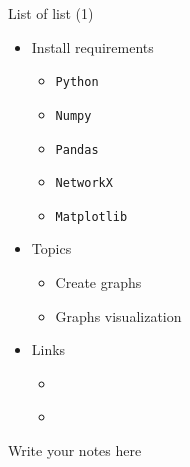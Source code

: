 \documentclass[aspectratio=169]{beamer}
\begin{document}
        \begin{frame}{List of list (1)}
            \begin{itemize}
                \item Install requirements
                    \begin{itemize}
                        \item \texttt{Python}
                        \item \texttt{Numpy}
                        \item \texttt{Pandas}
                        \item \texttt{NetworkX}
                        \item \texttt{Matplotlib}
                    \end{itemize}
                \item Topics 
                    \begin{itemize}
                        \item Create graphs
                        \item Graphs visualization
                    \end{itemize}
                \item Links
                    \begin{itemize}
                        \item \href{https://github.com/win7}{
                            }
                        \item \href{https://colab.research.google.com/}{
                            }
                    \end{itemize}
            \end{itemize}

            \begin{note}
                {Write your notes here}
            \end{note}
        \end{frame}
\end{document}
